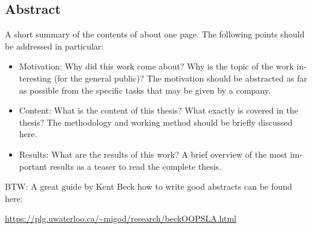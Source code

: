 

\begin{otherlanguage}{american}
	\chapter*{Abstract}
	A short summary of the contents of about one page. The following points should be addressed in particular:
	\begin{itemize}
		\item Motivation: Why did this work come about? Why is the topic of the work interesting (for the general public)? The motivation should be abstracted as far as possible from the specific tasks that may be given by a company.
		\item Content: What is the content of this thesis? What exactly is covered in the thesis? The methodology and working method should be briefly discussed here.
		\item Results: What are the results of this work? A brief overview of the most important results as a teaser to read the complete thesis.
	\end{itemize}
	\medskip
	
	\noindent
	BTW: A great guide by Kent Beck how to write good abstracts can be found here:
	\begin{center}
		\url{https://plg.uwaterloo.ca/~migod/research/beckOOPSLA.html}
	\end{center}
\end{otherlanguage}
